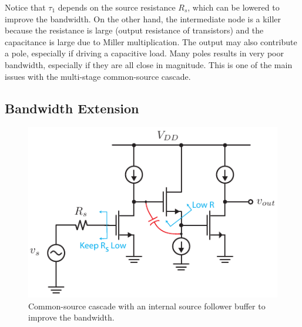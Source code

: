 Notice that $\tau_1$ depends on the source resistance $R_s$, which can be lowered to improve the bandwidth.  On the other hand,  the intermediate node is a killer because the resistance is large (output resistance of transistors) and the capacitance is large due to Miller multiplication.   The output may also contribute a pole, especially if driving a capacitive load.  Many poles results in very poor bandwidth, especially if they are all close in magnitude.  This is one of the main issues with the multi-stage common-source cascade.
\subsection{Bandwidth Extension}
\begin{figure}[tb]
\begin{center}
\includegraphics[scale=1]{55cs_cd_cs_casc}
\end{center}
\caption{Common-source cascade with an internal source follower buffer to improve the bandwidth.} \label{fig:55cs_cd_cs_casc}
\end{figure}

